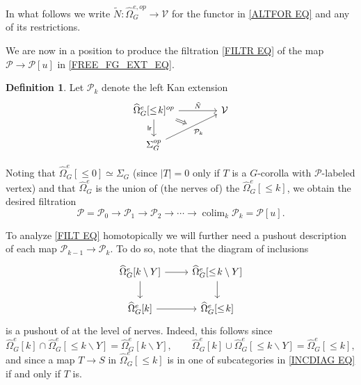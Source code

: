 \documentclass[a4paper,10pt
,draft
]{article}%
\numberwithin{equation}{section}
\numberwithin{figure}{section}
\theoremstyle{definition} %
\newtheorem{definition}[equation]{Definition}%
\DeclareMathOperator{\colim}{colim}%
\newcommand{\V}{\ensuremath{\mathcal V}}
\renewcommand{\P}{\ensuremath{\mathcal P}}
\newcommand{\1}{\ensuremath{\mathbbm 1}}%
\begin{document}
In what follows we write $\tilde{N} \colon \widehat{\Omega}_G^{e,op} \to \mathcal{V}$ for the functor in \eqref{ALTFOR EQ} and any of its restrictions.

We are now in a position to produce the filtration \eqref{FILTR EQ}
of the map $\mathcal{P} \to \mathcal{P}[u]$
in \eqref{FREE_FG_EXT_EQ}.

\begin{definition} \label{PK_DEFN}
  Let $\P_k$ denote the left Kan extension
\[
\begin{tikzcd}[column sep =4em]
	|[alias=U]| \widehat{\Omega}_G^e[\leq\! k]^{op} \arrow[r, "\tilde{N}"] \arrow[d, "\mathsf{lr}"'] & \V
\\
	\Sigma_G^{op} \arrow[ur, "\P_k"', ""{name=V}]
	\arrow[Rightarrow, from=U, to=V]
\end{tikzcd}
\]
\end{definition}
Noting that $\widehat{\Omega}_G^e[\leq\! 0] \simeq \Sigma_G$
(since $|T|=0$ only if $T$ is a $G$-corolla with $\mathcal{P}$-labeled vertex)
and that $\widehat{\Omega}_G^e$
is the union of (the nerves of) the 
$\widehat{\Omega}_G^e[\leq\! k]$,
we obtain the desired filtration
\begin{equation}\label{FILT EQ}
	\mathcal{P} = 
	\mathcal{P}_0 \to 
	\mathcal{P}_1 \to
	\mathcal{P}_2 \to
	\cdots \to 
	\colim_k \mathcal{P}_k = \mathcal{P}[u].
\end{equation}

To analyze \eqref{FILT EQ} homotopically we will further need a pushout description of each map 
$\mathcal{P}_{k-1} \to \mathcal{P}_k$. To do so,  note that the diagram of inclusions
\begin{equation}\label{INCDIAG EQ}
\begin{tikzcd}
	\widehat{\Omega}_G^{e}[k \mathbin{\backslash} Y]
	\arrow[d] \arrow[r] &
	\widehat{\Omega}_G^{e}[\leq\! k \mathbin{\backslash} Y]
	\arrow[d]
\\
	\widehat{\Omega}_G^e[k] \arrow[r] &
	\widehat{\Omega}_G^e[\leq\! k]
\end{tikzcd}
\end{equation}
is a pushout of at the level of nerves.
Indeed, this follows since
\[
	\widehat{\Omega}_G^e[k] \cap
	\widehat{\Omega}_G^{e}[\leq\! k \mathbin{\backslash} Y]
	= \widehat{\Omega}_G^{e}[k \mathbin{\backslash} Y],
\qquad
	\widehat{\Omega}_G^e[k] \cup 
	\widehat{\Omega}_G^{e}[\leq\! k\mathbin{\backslash} Y]
	= \widehat{\Omega}_G^{e}[\leq\! k],
\]
and since a map $T \to S$ in 
$\widehat{\Omega}_G^e[\leq\! k]$ is in one of subcategories in \eqref{INCDIAG EQ} if and only if $T$ is.
\end{document}
